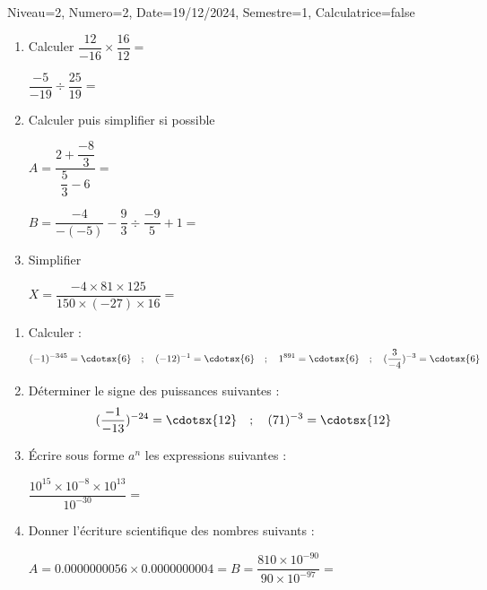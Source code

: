 \documentclass[a4paper,12pt]{article}
\begin{document}
\begin{Maquette}[DS]{Niveau=2, Numero=2, Date=19/12/2024, Semestre=1, Calculatrice=false}

\begin{exercice}[BaremeDetaille]
\begin{enumerate}
\item Calculer 
$\dfrac{12}{-16}\times \dfrac{16}{12}=$\anserline[1]

$\dfrac{-5}{-19}\div \dfrac{25}{19}=$\anserline[1]

\item Calculer puis simplifier si possible

$A=\dfrac{2+\dfrac{-8}{3}}{\dfrac{5}{3}-6}=$\anserline[2]

$B=\dfrac{-4}{-(-5)}-\dfrac{9}{3}\div\dfrac{-9}{5}+1 =$\anserline[3]

\item Simplifier 

$X=\dfrac{-4\times 81\times 125}{150\times (-27)\times 16}=$\anserline[4]

\end{enumerate}
\end{exercice}


\begin{exercice}[BaremeDetaille]
\begin{enumerate}
\item{} Calculer : 
\[
 (-1)^{-345}=\cdotsx{6} \quad; \quad (-12)^{-1}=\cdotsx{6} \quad; \quad 1^{891}=\cdotsx{6} \quad; \quad (\dfrac{3}{-4})^{-3}=\cdotsx{6}
\]
\item{} Déterminer le signe des puissances suivantes :
\[ (\dfrac{-1}{-13})^{-24}=\cdotsx{12} \quad; \quad 
	(71)^{-3}=\cdotsx{12}
\] 
\item{} Écrire sous forme $a^{n}$ les expressions suivantes :

\(	\dfrac{10^{15}\times 10^{-8}\times 10^{13}}{10^{-30}}=
\)
\anserline[4]
\item{} Donner l'écriture scientifique des nombres suivants :

$A=0.0000000056\times 0.0000000004=$\anserline[1]
$B=\dfrac{810\times 10^{-90}}{90\times 10^{-97}}=$\anserline[1]
\end{enumerate}
\end{exercice}


\end{Maquette}
\end{document}
